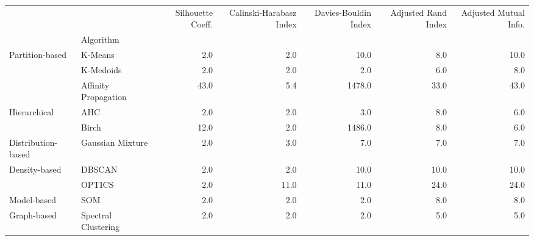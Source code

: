 \begin{tabular}{llrrrrr}
 &  & Silhouette Coeff. & Calinski-Harabasz Index & Davies-Bouldin Index & Adjusted Rand Index & Adjusted Mutual Info. \\
 & Algorithm &  &  &  &  &  \\
\multirow[c]{3}{*}{Partition-based} & K-Means & 2.0 & 2.0 & 10.0 & 8.0 & 10.0 \\
 & K-Medoids & 2.0 & 2.0 & 2.0 & 6.0 & 8.0 \\
 & Affinity Propagation & 43.0 & 5.4 & 1478.0 & 33.0 & 43.0 \\
\multirow[c]{2}{*}{Hierarchical} & AHC & 2.0 & 2.0 & 3.0 & 8.0 & 6.0 \\
 & Birch & 12.0 & 2.0 & 1486.0 & 8.0 & 6.0 \\
Distribution-based & Gaussian Mixture & 2.0 & 3.0 & 7.0 & 7.0 & 7.0 \\
\multirow[c]{2}{*}{Density-based} & DBSCAN & 2.0 & 2.0 & 10.0 & 10.0 & 10.0 \\
 & OPTICS & 2.0 & 11.0 & 11.0 & 24.0 & 24.0 \\
Model-based & SOM & 2.0 & 2.0 & 2.0 & 8.0 & 8.0 \\
Graph-based & Spectral Clustering & 2.0 & 2.0 & 2.0 & 5.0 & 5.0 \\
\end{tabular}
